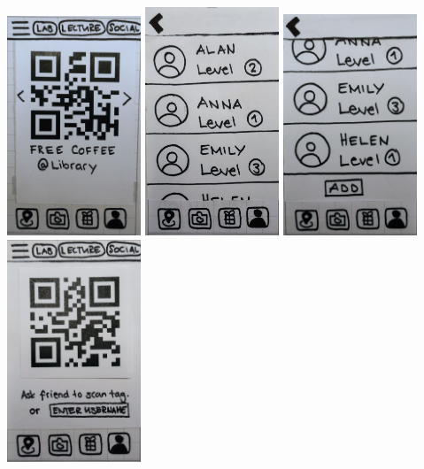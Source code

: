 \documentclass[10pt,twocolumn]{article} %
\begin{document}
\newpage\vspace*{25px}
\includegraphics[width=0.3\textwidth]{./figures/refined_proto/12.jpg}\hfill
\includegraphics[width=0.3\textwidth]{./figures/refined_proto/13.jpg}\hfill
\includegraphics[width=0.3\textwidth]{./figures/refined_proto/14.jpg}\hfill
\vspace*{25px}
\includegraphics[width=0.3\textwidth]{./figures/refined_proto/15.jpg}\hfill
\end{document}
